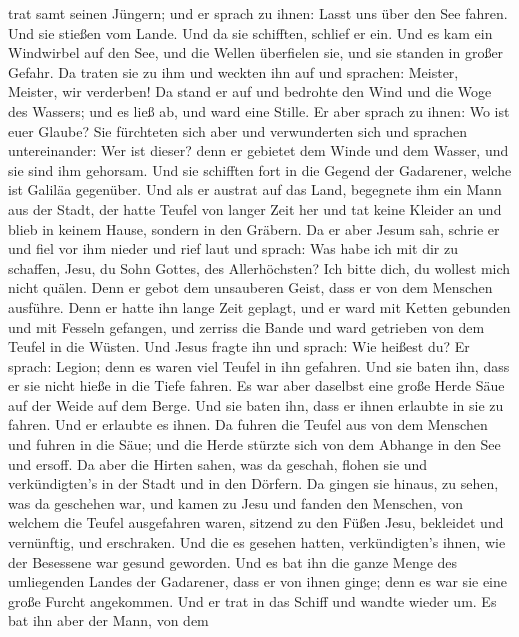 trat samt seinen Jüngern; und er sprach zu ihnen: Lasst uns über den See
fahren. Und sie stießen vom Lande.  Und da sie schifften,
schlief er ein. Und es kam ein Windwirbel auf den See, und die Wellen
überfielen sie, und sie standen in großer Gefahr.  Da
traten sie zu ihm und weckten ihn auf und sprachen: Meister, Meister,
wir verderben! Da stand er auf und bedrohte den Wind und die Woge des
Wassers; und es ließ ab, und ward eine Stille.  Er aber
sprach zu ihnen: Wo ist euer Glaube? Sie fürchteten sich aber und
verwunderten sich und sprachen untereinander: Wer ist dieser? denn er
gebietet dem Winde und dem Wasser, und sie sind ihm gehorsam.
 Und sie schifften fort in die Gegend der Gadarener, welche
ist Galiläa gegenüber.  Und als er austrat auf das Land,
begegnete ihm ein Mann aus der Stadt, der hatte Teufel von langer Zeit
her und tat keine Kleider an und blieb in keinem Hause, sondern in den
Gräbern.  Da er aber Jesum sah, schrie er und fiel vor ihm
nieder und rief laut und sprach: Was habe ich mit dir zu schaffen, Jesu,
du Sohn Gottes, des Allerhöchsten? Ich bitte dich, du wollest mich nicht
quälen.  Denn er gebot dem unsauberen Geist, dass er von
dem Menschen ausführe. Denn er hatte ihn lange Zeit geplagt, und er ward
mit Ketten gebunden und mit Fesseln gefangen, und zerriss die Bande und
ward getrieben von dem Teufel in die Wüsten.  Und Jesus
fragte ihn und sprach: Wie heißest du? Er sprach: Legion; denn es waren
viel Teufel in ihn gefahren.  Und sie baten ihn, dass er
sie nicht hieße in die Tiefe fahren.  Es war aber daselbst
eine große Herde Säue auf der Weide auf dem Berge. Und sie baten ihn,
dass er ihnen erlaubte in sie zu fahren. Und er erlaubte es ihnen.
 Da fuhren die Teufel aus von dem Menschen und fuhren in
die Säue; und die Herde stürzte sich von dem Abhange in den See und
ersoff.  Da aber die Hirten sahen, was da geschah, flohen
sie und verkündigten's in der Stadt und in den Dörfern.  Da
gingen sie hinaus, zu sehen, was da geschehen war, und kamen zu Jesu und
fanden den Menschen, von welchem die Teufel ausgefahren waren, sitzend
zu den Füßen Jesu, bekleidet und vernünftig, und erschraken.
 Und die es gesehen hatten, verkündigten's ihnen, wie der
Besessene war gesund geworden.  Und es bat ihn die ganze
Menge des umliegenden Landes der Gadarener, dass er von ihnen ginge;
denn es war sie eine große Furcht angekommen. Und er trat in das Schiff
und wandte wieder um.  Es bat ihn aber der Mann, von dem
